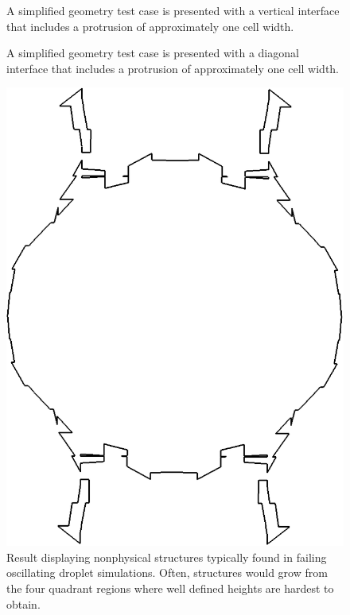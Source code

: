 \begin{figure}[htbp]
\begin{minipage}{0.3\textwidth}
		\caption{A simplified geometry test case is presented with a vertical interface that includes a protrusion of approximately one cell width.}
		\label{fig:90}
	\end{minipage}
\hfill
	\begin{minipage}{0.3\textwidth}
		\caption{A simplified geometry test case is presented with a diagonal interface that includes a protrusion of approximately one cell width.}
		\label{fig:45}
	\end{minipage}
\end{figure}

\begin{figure}
	\centering
	\includegraphics[width=0.4\linewidth]{figs/bad.png}
	\caption{Result displaying nonphysical structures typically found in failing oscillating droplet simulations. Often, structures would grow from the four quadrant regions where well defined heights are hardest to obtain.}
	\label{fig:45s}
\end{figure}

